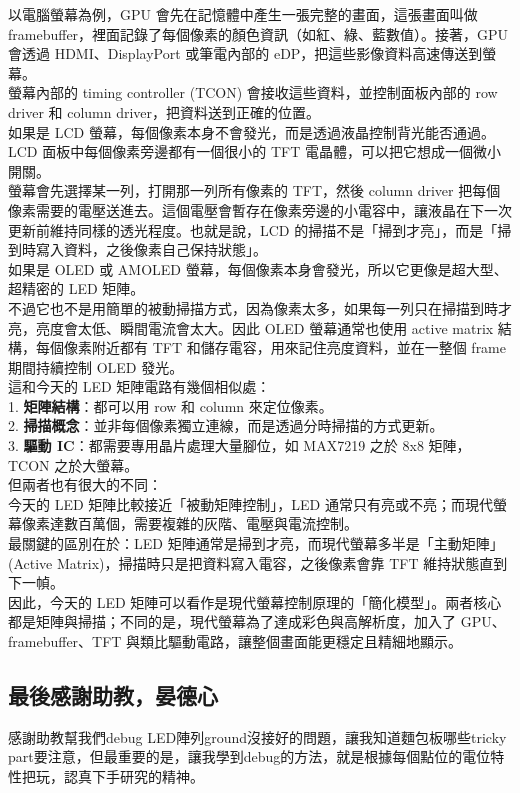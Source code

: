 \documentclass[12pt]{article}
\begin{document}
以電腦螢幕為例，GPU 會先在記憶體中產生一張完整的畫面，這張畫面叫做 framebuffer，裡面記錄了每個像素的顏色資訊（如紅、綠、藍數值）。接著，GPU 會透過 HDMI、DisplayPort 或筆電內部的 eDP，把這些影像資料高速傳送到螢幕。\\

螢幕內部的 timing controller (TCON) 會接收這些資料，並控制面板內部的 row driver 和 column driver，把資料送到正確的位置。\\

如果是 LCD 螢幕，每個像素本身不會發光，而是透過液晶控制背光能否通過。LCD 面板中每個像素旁邊都有一個很小的 TFT 電晶體，可以把它想成一個微小開關。\\

螢幕會先選擇某一列，打開那一列所有像素的 TFT，然後 column driver 把每個像素需要的電壓送進去。這個電壓會暫存在像素旁邊的小電容中，讓液晶在下一次更新前維持同樣的透光程度。也就是說，LCD 的掃描不是「掃到才亮」，而是「掃到時寫入資料，之後像素自己保持狀態」。\\

如果是 OLED 或 AMOLED 螢幕，每個像素本身會發光，所以它更像是超大型、超精密的 LED 矩陣。\\

不過它也不是用簡單的被動掃描方式，因為像素太多，如果每一列只在掃描到時才亮，亮度會太低、瞬間電流會太大。因此 OLED 螢幕通常也使用 active matrix 結構，每個像素附近都有 TFT 和儲存電容，用來記住亮度資料，並在一整個 frame 期間持續控制 OLED 發光。\\

這和今天的 LED 矩陣電路有幾個相似處：\\
1. \textbf{矩陣結構}：都可以用 row 和 column 來定位像素。\\
2. \textbf{掃描概念}：並非每個像素獨立連線，而是透過分時掃描的方式更新。\\
3. \textbf{驅動 IC}：都需要專用晶片處理大量腳位，如 MAX7219 之於 8x8 矩陣，TCON 之於大螢幕。\\

但兩者也有很大的不同：\\

今天的 LED 矩陣比較接近「被動矩陣控制」，LED 通常只有亮或不亮；而現代螢幕像素達數百萬個，需要複雜的灰階、電壓與電流控制。\\
最關鍵的區別在於：LED 矩陣通常是掃到才亮，而現代螢幕多半是「主動矩陣」(Active Matrix)，掃描時只是把資料寫入電容，之後像素會靠 TFT 維持狀態直到下一幀。\\

因此，今天的 LED 矩陣可以看作是現代螢幕控制原理的「簡化模型」。兩者核心都是矩陣與掃描；不同的是，現代螢幕為了達成彩色與高解析度，加入了 GPU、framebuffer、TFT 與類比驅動電路，讓整個畫面能更穩定且精細地顯示。
\subsection{最後感謝助教，晏德心}
感謝助教幫我們debug LED陣列ground沒接好的問題，讓我知道麵包板哪些tricky part要注意，但最重要的是，讓我學到debug的方法，就是根據每個點位的電位特性把玩，認真下手研究的精神。
\end{document}
